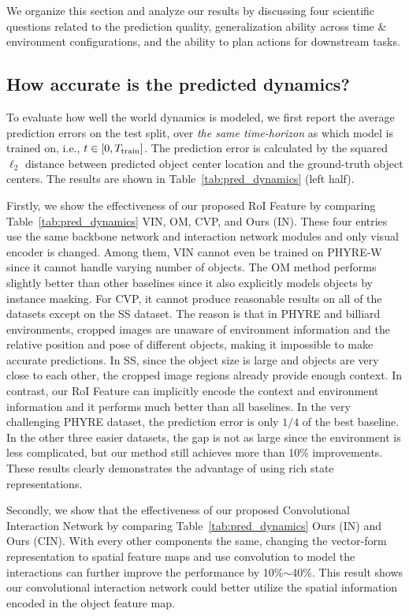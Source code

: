 \documentclass{article} \usepackage{iclr2021_conference,times}
\newcommand{\numoutput}{T}
\begin{document}
We organize this section and analyze our results by discussing four scientific questions related to the prediction quality, generalization ability across time \& environment configurations, and the ability to plan actions for downstream tasks.

\vspace{-0.5em}
\subsection{How accurate is the predicted dynamics?}
\label{sec:exp_pred}\vspace{-0.5em}
To evaluate how well the world dynamics is modeled, we first report the average prediction errors on the test split, over \textit{the same time-horizon} as which model is trained on, i.e., $t\in[0, \numoutput_{\rm train}]$. The prediction error is calculated by the squared $\ell_2$ distance between predicted object center location and the ground-truth object centers. The results are shown in Table~\ref{tab:pred_dynamics} (left half).

Firstly, we show the effectiveness of our proposed RoI Feature by comparing  Table~\ref{tab:pred_dynamics} VIN, OM, CVP, and Ours (IN). These four entries use the same backbone network and interaction network modules and only visual encoder is changed. Among them, VIN cannot even be trained on PHYRE-W since it cannot handle varying number of objects. The OM method performs slightly better than other baselines since it also explicitly models objects by instance masking. For CVP, it cannot produce reasonable results on all of the datasets except on the SS dataset. The reason is that in PHYRE and billiard environments, cropped images are unaware of environment information and the relative position and pose of different objects, making it impossible to make accurate predictions. In SS, since the object size is large and objects are very close to each other, the cropped image regions already provide enough context. In contrast, our RoI Feature can implicitly encode the context and environment information and it performs much better than all baselines. In the very challenging PHYRE dataset, the prediction error is only $1/4$ of the best baseline. In the other three easier datasets, the gap is not as large since the environment is less complicated, but our method still achieves more than 10\% improvements. These results clearly demonstrates the advantage of using rich state representations. 

Secondly, we show that the effectiveness of our proposed Convolutional Interaction Network by comparing Table~\ref{tab:pred_dynamics} Ours (IN) and Ours (CIN). With every other components the same, changing the vector-form representation to spatial feature maps and use convolution to model the interactions can further improve the performance by 10\%$\sim$40\%. This result shows our convolutional interaction network could better utilize the spatial information encoded in the object feature map.
\end{document}
